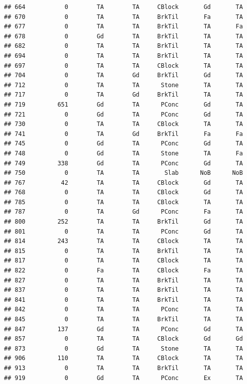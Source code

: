 \documentclass[]{article}
\begin{document}
\begin{verbatim}
## 664           0        TA        TA     CBlock       Gd       TA
## 670           0        TA        TA     BrkTil       Fa       TA
## 677           0        TA        TA     BrkTil       TA       Fa
## 678           0        Gd        TA     BrkTil       TA       TA
## 682           0        TA        TA     BrkTil       TA       TA
## 694           0        TA        TA     BrkTil       TA       TA
## 697           0        TA        TA     CBlock       TA       TA
## 704           0        TA        Gd     BrkTil       Gd       TA
## 712           0        TA        TA      Stone       TA       TA
## 717           0        TA        Gd     BrkTil       TA       TA
## 719         651        Gd        TA      PConc       Gd       TA
## 721           0        Gd        TA      PConc       Gd       TA
## 730           0        TA        TA     CBlock       TA       TA
## 741           0        TA        Gd     BrkTil       Fa       Fa
## 745           0        Gd        TA      PConc       Gd       TA
## 748           0        Gd        TA      Stone       TA       Fa
## 749         338        Gd        TA      PConc       Gd       TA
## 750           0        TA        TA       Slab      NoB      NoB
## 767          42        TA        TA     CBlock       Gd       TA
## 768           0        TA        TA     CBlock       Gd       TA
## 785           0        TA        TA     CBlock       TA       TA
## 787           0        TA        Gd      PConc       Fa       TA
## 800         252        TA        TA     BrkTil       Gd       TA
## 801           0        TA        TA      PConc       Gd       TA
## 814         243        TA        TA     CBlock       TA       TA
## 815           0        TA        TA     BrkTil       TA       TA
## 817           0        TA        TA     CBlock       TA       TA
## 822           0        Fa        TA     CBlock       Fa       TA
## 827           0        TA        TA     BrkTil       TA       TA
## 837           0        TA        TA     BrkTil       TA       TA
## 841           0        TA        TA     BrkTil       TA       TA
## 842           0        TA        TA      PConc       TA       TA
## 845           0        TA        TA     BrkTil       TA       TA
## 847         137        Gd        TA      PConc       Gd       TA
## 857           0        TA        TA     CBlock       Gd       Gd
## 873           0        Gd        TA      Stone       TA       TA
## 906         110        TA        TA     CBlock       TA       TA
## 913           0        TA        TA     BrkTil       TA       TA
## 919           0        Gd        TA      PConc       Ex       TA

\end{verbatim}
\end{document}
